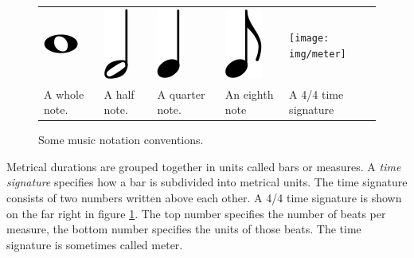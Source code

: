 \begin{figure}
\centering
\begin{tabular}{lllll}
\parbox{0.15\linewidth}{
\centering
\includegraphics[scale=0.5]{img/whole_note}
}
&
\parbox{0.15\linewidth}{
\centering
\includegraphics[scale=0.5]{img/half_note}
}
&
\parbox{0.15\linewidth}{
\centering
\includegraphics[scale=0.5]{img/quarter_note}
}
&
\parbox{0.15\linewidth}{
\centering
\includegraphics[scale=0.5]{img/eighth_note}
}
&
\parbox{0.15\linewidth}{
\centering
\texttt{[image: img/meter]}
}
\\
A whole note. & A half note. & A quarter note. & An eighth note & A 4/4 time signature\\

\end{tabular}
\caption{Some music notation conventions.}
\label{fig:notation}
\end{figure}

Metrical durations are grouped together in units called bars or measures. A \textit{time signature} specifies how a bar is subdivided into metrical units. The time signature consists of two numbers written above each other. A 4/4 time signature is shown on the far right in figure \ref{fig:notation}. The top number specifies the number of beats per measure, the bottom number specifies the units of those beats. The time signature is sometimes called meter.

